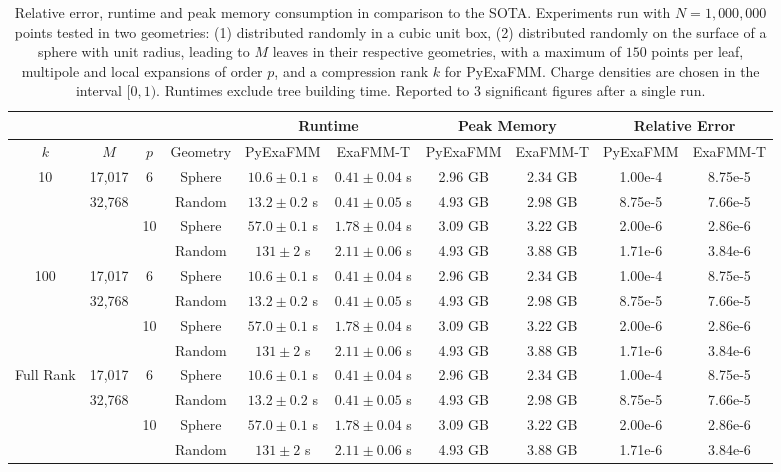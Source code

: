 \documentclass{IEEEcsmag}
\begin{document}
\begin{table}
	\centering
	\caption{Relative error, runtime and peak memory consumption in comparison to the SOTA. Experiments run with $N=1,000,000$ points tested in two geometries: (1) distributed randomly in a cubic unit box, (2) distributed randomly on the surface of a sphere with unit radius, leading to $M$ leaves in their respective geometries, with a maximum of $150$ points per leaf, multipole and local expansions of order $p$, and a compression rank $k$ for PyExaFMM. Charge densities are chosen in the interval $[0, 1)$. Runtimes exclude tree building time. Reported to 3 significant figures after a single run.}
	\begin{tabular}{|*{10}{c|}}
		\hline
		& & &   & \multicolumn{2}{c|}{Runtime} & \multicolumn{2}{c|}{Peak Memory} & \multicolumn{2}{c|}{Relative Error}\\
		\hline
		$k$ & $M$ &$p$ &  Geometry   &   PyExaFMM  &  ExaFMM-T &    PyExaFMM  &  ExaFMM-T  &   PyExaFMM  &  ExaFMM-T\\
		\hline
		10 & 17,017 & 6   &   Sphere  &  $10.6 \pm 0.1$ s & $0.41 \pm 0.04$ s  &  2.96 GB  &   2.34 GB  & 1.00e-4 & 8.75e-5\\
		 & 32,768 &    &   Random  &  $13.2 \pm 0.2$ s &  $0.41 \pm 0.05$ s &  4.93 GB  &   2.98 GB  & 8.75e-5 & 7.66e-5\\
		 &  & 10   &   Sphere  &  $57.0 \pm 0.1$ s &  $1.78 \pm 0.04$ s  &  3.09 GB  &   3.22 GB  & 2.00e-6 & 2.86e-6\\
		 &  &    &   Random  & $131 \pm 2$ s &   $2.11 \pm 0.06$ s  &  4.93 GB  &   3.88 GB  & 1.71e-6 & 3.84e-6\\
		100 & 17,017 & 6   &   Sphere  &  $10.6 \pm 0.1$ s & $0.41 \pm 0.04$ s  &  2.96 GB  &   2.34 GB  & 1.00e-4 & 8.75e-5\\
		 & 32,768 &    &   Random  &  $13.2 \pm 0.2$ s &  $0.41 \pm 0.05$ s &  4.93 GB  &   2.98 GB  & 8.75e-5 & 7.66e-5\\
		 &  & 10   &   Sphere  &  $57.0 \pm 0.1$ s &  $1.78 \pm 0.04$ s  &  3.09 GB  &   3.22 GB  & 2.00e-6 & 2.86e-6\\
		 &  &    &   Random  & $131 \pm 2$ s &   $2.11 \pm 0.06$ s  &  4.93 GB  &   3.88 GB  & 1.71e-6 & 3.84e-6\\
		Full Rank & 17,017 & 6   &   Sphere  &  $10.6 \pm 0.1$ s & $0.41 \pm 0.04$ s  &  2.96 GB  &   2.34 GB  & 1.00e-4 & 8.75e-5\\
		 & 32,768 &    &   Random  &  $13.2 \pm 0.2$ s &  $0.41 \pm 0.05$ s &  4.93 GB  &   2.98 GB  & 8.75e-5 & 7.66e-5\\
		 &  & 10   &   Sphere  &  $57.0 \pm 0.1$ s &  $1.78 \pm 0.04$ s  &  3.09 GB  &   3.22 GB  & 2.00e-6 & 2.86e-6\\
		 &  &    &   Random  & $131 \pm 2$ s &   $2.11 \pm 0.06$ s  &  4.93 GB  &   3.88 GB  & 1.71e-6 & 3.84e-6\\
		\hline
	\end{tabular}
	\label{tab:performance}
 \end{table}
\end{document}
